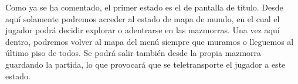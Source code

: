 Como ya se ha comentado, el primer estado es el de pantalla de título. Desde aquí solamente podremos acceder al estado de mapa de mundo, en el cual el jugador podrá decidir explorar o adentrarse en las mazmorras. Una vez aquí dentro, podremos volver al mapa del menú siempre que muramos o lleguemos al último piso de todos. Se podrá salir también desde la propia mazmorra guardando la partida, lo que provocará que se teletransporte el jugador a este estado.

\cleardoublepage


